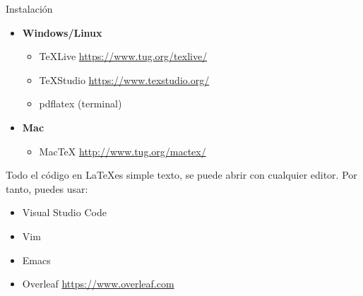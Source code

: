\begin{frame}[fragile]{Instalación}
  \begin{itemize}
    \item \textbf{Windows/Linux}
          \begin{itemize}
            \item TeXLive \url{https://www.tug.org/texlive/}
            \item TeXStudio \url{https://www.texstudio.org/}
            \item pdflatex (terminal)
          \end{itemize}
    \item \textbf{Mac}
          \begin{itemize}
            \item MacTeX \url{http://www.tug.org/mactex/}
          \end{itemize}
  \end{itemize}
  Todo el código en \LaTeX es simple texto, se puede abrir con cualquier editor. Por tanto, puedes usar:
  \begin{itemize}
    \item{Visual Studio Code}
    \item {Vim}
    \item {Emacs}
    \item {Overleaf} \url{https://www.overleaf.com}
  \end{itemize}
\end{frame}
